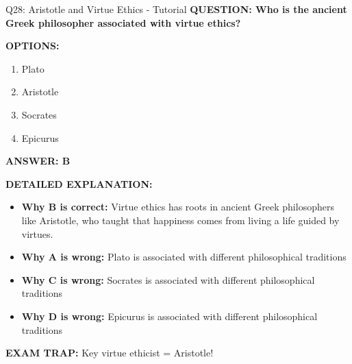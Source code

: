 \documentclass[8pt]{beamer}
\begin{document}
	\begin{frame}{Q28: Aristotle and Virtue Ethics - Tutorial}
		\fontsize{6.5}{7.5}\selectfont
		\textbf{QUESTION: Who is the ancient Greek philosopher associated with virtue ethics?}
		
		\vspace{0.1cm}
		\textbf{OPTIONS:}
		\begin{enumerate}
			\item Plato
			\item Aristotle
			\item Socrates
			\item Epicurus
		\end{enumerate}
		
		\vspace{0.1cm}
		\textcolor{myblue}{\textbf{ANSWER: B}}
		
		\vspace{0.1cm}
		\textbf{DETAILED EXPLANATION:}
		\begin{itemize}
			\item \textbf{Why B is correct:} Virtue ethics has roots in ancient Greek philosophers like Aristotle, who taught that happiness comes from living a life guided by virtues.
			\item \textbf{Why A is wrong:} Plato is associated with different philosophical traditions
			\item \textbf{Why C is wrong:} Socrates is associated with different philosophical traditions
			\item \textbf{Why D is wrong:} Epicurus is associated with different philosophical traditions
		\end{itemize}
		
		\textcolor{myred}{\textbf{EXAM TRAP:}} Key virtue ethicist = \textcolor{myblue}{Aristotle}!
	\end{frame}
	
\end{document}
